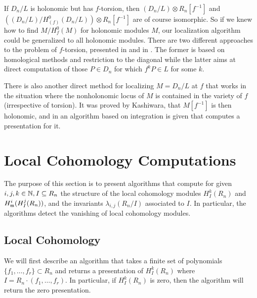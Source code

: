 \begin{remark}
If $D_n/L$ is holonomic but has $f$-torsion, then 
$(D_n/L)\otimes R_n[f^{-1}]$ 
and $((D_n/L)/H^0_{(f)}(D_n/L))\otimes R_n[f^{-1}]$ are of course
isomorphic.  So if we
knew how to find $M/H^0_f(M)$ for holonomic modules $M$, our localization
algorithm could be generalized to all holonomic modules. There are two
different approaches to the problem of $f$-torsion, presented in
\cite{DM:O-T1} and in \cite{DM:Ts,DM:Ts0}. The former is based on homological
methods and restriction to the diagonal 
while the latter aims at direct computation of
those $P\in D_n$ for which $f^k P\in L$ for some $k$. 

There is also another direct method for localizing $M=D_n/L$ at $f$
that works in the situation where the nonholonomic locus of $M$ is
contained in the variety of $f$ (irrespective of torsion). 
It was proved by Kashiwara, that
$M[f^{-1}]$ is then holonomic, and in \cite{DM:O-T-W} an algorithm based
on integration is
given that computes a presentation for it.
\end{remark}

%
\section{Local Cohomology Computations}
The purpose of this section is to present algorithms
that compute 
for given $i,j,k\in {\mathbb N}, I\subseteq  R_n$ 
the structure of the
local cohomology modules $H^k_I(R_n)$ and  $H^i_{\mathfrak m}(H^j_I(R_n))$, and the
invariants $\lambda_{i,j}(R_n/I)$ associated to $I$.
%
In particular, the algorithms 
detect the vanishing of local
cohomology modules. 
\subsection{Local Cohomology}
We will first describe an algorithm that takes a finite
set of polynomials $\{f_1,\ldots,f_r\}\subset R_n$ and
returns a 
presentation of $H^k_I(R_n)$ where $I=R_n\cdot(f_1,\ldots,f_r)$. In particular,
if $H^k_I(R_n)$ is zero, then the algorithm will return the zero
presentation. 

